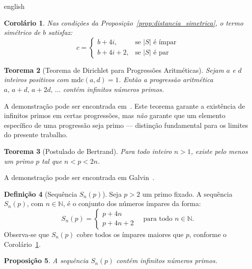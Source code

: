 \documentclass[a4paper,11pt]{article}
\newtheorem{theorem}{Teorema}[section]
\newtheorem{proposition}[theorem]{Proposição}
\newtheorem{corollary}[theorem]{Corolário}
\theoremstyle{definition}
\newtheorem{definition}[theorem]{Definição}
\theoremstyle{remark}
\begin{document}
\begin{otherlanguage*}{english}
		\begin{corollary}\label{coro:par_simetrico}
			Nas condições da Proposição~\ref{prop:distancia_simetrica}, o termo
			simétrico de $b$ satisfaz:
			\[
			c =
			\begin{cases}
				b + 4i, & \text{se } |S| \text{ é ímpar} \\
				b + 4i + 2, & \text{se } |S| \text{ é par}
			\end{cases}
			\]
		\end{corollary}
		
		\begin{theorem}[Teorema de Dirichlet para Progressões Aritméticas]%
			\label{teo:dirichlet}
			Sejam $a$ e $d$ inteiros positivos com $\mathrm{mdc}(a,d) = 1$. Então a
			progressão aritmética $a,\, a+d,\, a+2d,\, \dotsc$ contém infinitos números
			primos.
		\end{theorem}
		
		A demonstração pode ser encontrada em~\cite{apostol}. Este teorema garante
		a existência de infinitos primos em certas progressões, mas \emph{não}
		garante que um elemento específico de uma progressão seja primo — distinção
		fundamental para os limites do presente trabalho.
		
		\begin{theorem}[Postulado de Bertrand]\label{teo:postulado_de_bertrand}
			Para todo inteiro $n > 1$, existe pelo menos um primo $p$ tal que
			$n < p < 2n$.
		\end{theorem}
		
		A demonstração pode ser encontrada em Galvin~\cite{Galvin2013}.
		
		\begin{definition}[Sequência $S_n(p)$]\label{def:snp}
			Seja $p > 2$ um primo fixado. A sequência $S_n(p)$, com $n \in \mathbb{N}$,
			é o conjunto dos números ímpares da forma:
			\[
			S_n(p) =
			\begin{cases}
				p + 4n \\
				p + 4n + 2
			\end{cases}
			\quad \text{para todo } n \in \mathbb{N}.
			\]
			Observa-se que $S_n(p)$ cobre todos os ímpares maiores que $p$, conforme
			o Corolário~\ref{coro:par_simetrico}.
		\end{definition}
		
		\begin{proposition}\label{prop:snp_infinitos_primos}
			A sequência $S_n(p)$ contém infinitos números primos.
		\end{proposition}
		

\end{otherlanguage*}
\end{document}
